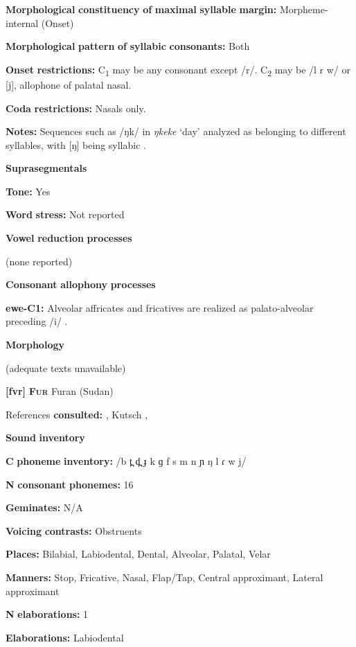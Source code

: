 \begin{styleBody}
\textbf{Morphological} \textbf{constituency} \textbf{of} \textbf{maximal} \textbf{syllable} \textbf{margin:} Morpheme-internal (Onset)

\textbf{Morphological} \textbf{pattern} \textbf{of} \textbf{syllabic} \textbf{consonants:} Both

\textbf{Onset} \textbf{restrictions:} C\textsubscript{1} may be any consonant except /r/. C\textsubscript{2} may be /l r w/ or [j], allophone of palatal nasal.

\textbf{Coda} \textbf{restrictions:} Nasals only.

\textbf{Notes:} Sequences such as /ŋk/ in \textit{ŋkeke} ‘day’ analyzed as belonging to different syllables, with [ŋ] being syllabic \citep[39]{Ameka1991}.

\textbf{Suprasegmentals}

\textbf{Tone:} Yes

\textbf{Word} \textbf{stress:} Not reported

\textbf{Vowel} \textbf{reduction} \textbf{processes}

(none reported)

\textbf{Consonant} \textbf{allophony} \textbf{processes}

\textbf{ewe-C1:} Alveolar affricates and fricatives are realized as palato-alveolar preceding /i/ \citep[9]{Jalloh2005}.

\textbf{Morphology}

(adequate texts unavailable)

\textbf{[fvr]}   \textbf{\textsc{Fur}}  Furan (Sudan)

References \textbf{consulted:} \citet{Jakobi1990}, Kutsch \citet{LojengaWaag2004}, \citet{Noel2008}

\textbf{Sound} \textbf{inventory}

\textbf{C} \textbf{phoneme} \textbf{inventory:} /b t̪ d̪ ɟ k ɡ f s m n ɲ ŋ l ɾ w j/

\textbf{N} \textbf{consonant} \textbf{phonemes:} 16

\textbf{Geminates:} N/A

\textbf{Voicing} \textbf{contrasts:} Obstruents

\textbf{Places:} Bilabial, Labiodental, Dental, Alveolar, Palatal, Velar

\textbf{Manners:} Stop, Fricative, Nasal, Flap/Tap, Central approximant, Lateral approximant

\textbf{N} \textbf{elaborations:} 1

\textbf{Elaborations:} Labiodental


\end{styleBody}
